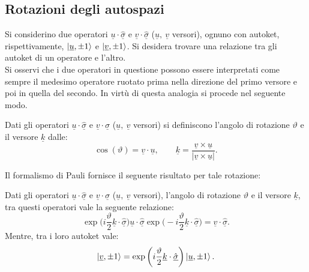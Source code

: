 \subsection{Rotazioni degli autospazi}
Si considerino due operatori $\underline{u}\cdot\hat{\underline{\sigma}}$ e $\underline{v}\cdot\hat{\underline{\sigma}}$ ($\underline{u},\ \underline{v}$ versori), ognuno con autoket, rispettivamente, $ \ket{\underline{u},\pm1}$ e $ \ket{\underline{v},\pm1}$. Si desidera trovare una relazione tra gli autoket di un operatore e l'altro.\\
Si osservi che i due operatori in questione possono essere interpretati come sempre il medesimo operatore ruotato prima nella direzione del primo versore e poi in quella del secondo. In virtù di questa analogia si procede nel seguente modo.
\begin{definition}
    Dati gli operatori $\underline{u}\cdot\hat{\underline{\sigma}}$ e $\underline{v}\cdot\hat{\underline{\sigma}}$ ($\underline{u},\ \underline{v}$ versori) si definiscono l'angolo di rotazione $\vartheta$ e il versore $\underline{k}$ dalle:
    \begin{equation*}
        \cos(\vartheta)=\underline{v}\cdot\underline{u},\qquad\underline{k}=\frac{\underline{v}\times\underline{u}}{|\underline{v}\times\underline{u}|}.
    \end{equation*}\label{def:Angolo Versore Rotazione Operatori}
\end{definition}
Il formalismo di Pauli fornisce il seguente risultato per tale rotazione:
\begin{theorem}
    Dati gli operatori $\underline{u}\cdot\hat{\underline{\sigma}}$ e $\underline{v}\cdot\hat{\underline{\sigma}}$ ($\underline{u},\ \underline{v}$ versori), l'angolo di rotazione $\vartheta$ e il versore $\underline{k}$, tra questi operatori vale la seguente relazione:
    \begin{equation*}
        \exp\bigg(i\frac{\vartheta}{2}\underline{k}\cdot\hat{\underline{\sigma}}\bigg)\underline{u}\cdot\hat{\underline{\sigma}}\exp\bigg(-i\frac{\vartheta}{2}\underline{k}\cdot\hat{\underline{\sigma}}\bigg)=\underline{v}\cdot\hat{\underline{\sigma}}.
    \end{equation*}
    Mentre, tra i loro autoket vale:
    \begin{equation*}
        \ket{\underline{v},\pm1}=\exp\bigg(i\frac{\vartheta}{2}\underline{k}\cdot\hat{\underline{\sigma}}\bigg)\ket{\underline{u},\pm1}.
    \end{equation*}
\end{theorem}
